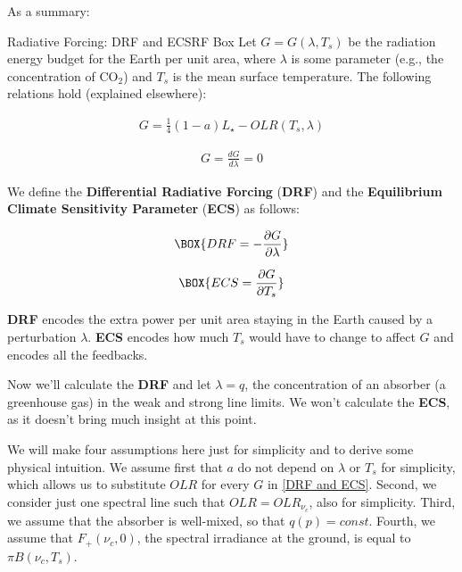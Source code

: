 As a summary:
\begin{fact}{Radiative Forcing: DRF and ECS}{RF Box}\label{RF Box}
    Let $G=G(\lambda,T_s)$ be the radiation energy budget for the Earth per unit area, where $\lambda$ is some parameter (e.g., the concentration of CO$_2$) and $T_s$ is the mean surface temperature. The following relations hold (explained elsewhere):

    \begin{minipage}{0.5\linewidth}
        \begin{gather*}
            G = \frac{1}{4}(1-a)L_\star-OLR(T_s,\lambda)
        \end{gather*}
    \end{minipage}
    \begin{minipage}{0.5\linewidth}
        \begin{gather*}
            G = \frac{dG}{d\lambda} = 0
        \end{gather*}
    \end{minipage}
    \vspace{2mm}
    
    We define the \textbf{Differential Radiative Forcing} (\textbf{DRF}) and the \textbf{Equilibrium Climate Sensitivity Parameter} (\textbf{ECS}) as follows:

    \begin{minipage}{0.5\linewidth}
        \begin{gather}
            \BOX{DRF = -\frac{\partial G}{\partial \lambda}}
        \end{gather}
    \end{minipage}
    \begin{minipage}{0.5\linewidth}
        \begin{gather}
            \BOX{ECS = \frac{\partial G}{\partial T_s}}
        \end{gather}
    \end{minipage}

    \textbf{DRF} encodes the extra power per unit area staying in the Earth caused by a perturbation $\lambda$. \textbf{ECS} encodes how much $T_s$ would have to change to affect $G$ and encodes all the feedbacks.
\end{fact}

Now we'll calculate the \textbf{DRF} and let $\lambda=q$, the concentration of an absorber (a greenhouse gas) in the weak and strong line limits. We won't calculate the \textbf{ECS}, as it doesn't bring much insight at this point.

We will make four assumptions here just for simplicity and to derive some physical intuition. We assume first that $a$ do not depend on $\lambda$ or $T_s$ for simplicity, which allows us to substitute $OLR$ for every $G$ in \ref{DRF and ECS}. Second, we consider just one spectral line such that $OLR=OLR_{\nu_c}$, also for simplicity. Third, we assume that the absorber is well-mixed, so that $q(p)=const$. Fourth, we assume that $F_+(\nu_c,0)$, the spectral irradiance at the ground, is equal to $\pi B(\nu_c,T_s)$.


